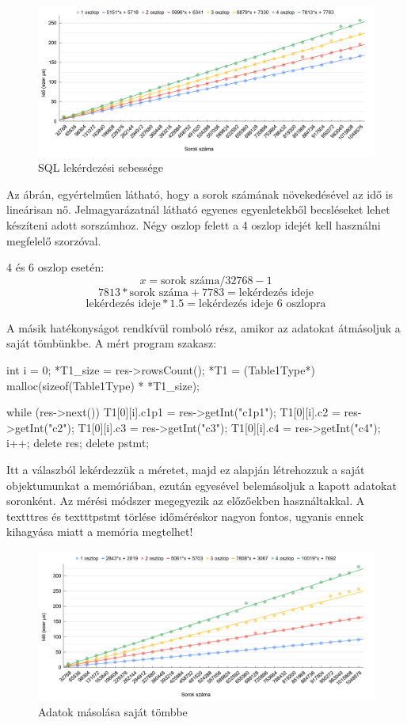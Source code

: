 \begin{figure}[h!]
\centering
\includegraphics[width=\textwidth]{images/sqlquery.png}
\caption{SQL lekérdezési sebessége}
\label{fig:schema}
\end{figure}
Az ábrán, egyértelműen látható, hogy a sorok számának növekedésével az idő is lineárisan nő.
Jelmagyarázatnál látható egyenes egyenletekből becsléseket lehet készíteni adott sorszámhoz. Négy oszlop felett a 4 oszlop idejét kell használni megfelelő szorzóval.

4 és 6 oszlop esetén:
$$ x = \text{sorok száma}/32768 - 1 $$
$$ 7813 * \text{sorok száma} + 7783 = \text{lekérdezés ideje}$$
$$ \text{lekérdezés ideje} * 1.5 = \text{lekérdezés ideje 6 oszlopra} $$


A másik hatékonyságot rendkívül romboló rész, amikor az adatokat átmásoljuk a saját tömbünkbe.
A mért program szakasz:

\begin{python}
int i = 0;
*T1_size = res->rowsCount();
*T1 = (Table1Type*) malloc(sizeof(Table1Type) * *T1_size);

while (res->next())
	{
		T1[0][i].c1p1 = res->getInt("c1p1");
		T1[0][i].c2 = res->getInt("c2");
		T1[0][i].c3 = res->getInt("c3");
		T1[0][i].c4 = res->getInt("c4");
		i++;
	}
delete res;
delete pstmt;
\end{python}

Itt a válaszból lekérdezzük a méretet, majd ez alapján létrehozzuk a saját objektumunkat a memóriában, ezután egyesével belemásoljuk 
a kapott adatokat soronként.
Az mérési módszer megegyezik az előzőekben használtakkal.
A texttt{res} és texttt{pstmt} törlése időméréskor nagyon fontos, ugyanis ennek kihagyása miatt a memória megtelhet!


\begin{figure}[h!]
\centering
\includegraphics[width=\textwidth]{images/ccopy.png}
\caption{Adatok másolása saját tömbbe}
\label{fig:schema}
\end{figure}


